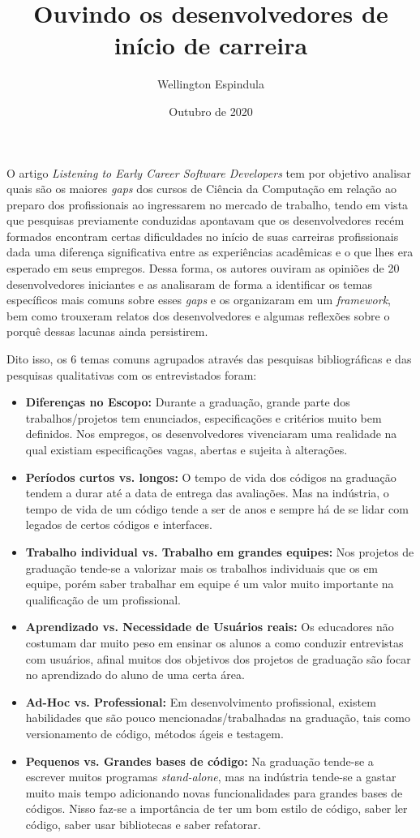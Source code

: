 \documentclass[12pt, a4paper]{article}
\title{Ouvindo os desenvolvedores de início de carreira}
\author{Wellington Espindula}
\date{Outubro de 2020}
\newcommand{\tit}[1]{\textit{#1}}
\newcommand{\tb}[1]{\textbf{#1}}
\begin{document}
    \maketitle
    O artigo \tit{Listening to Early Career Software Developers} tem por objetivo analisar quais são os maiores \tit{gaps} dos cursos de Ciência da Computação em relação ao preparo dos profissionais ao ingressarem no mercado de trabalho, tendo em vista que pesquisas previamente conduzidas apontavam que os desenvolvedores recém formados encontram certas dificuldades no início de suas carreiras profissionais dada uma diferença significativa entre as experiências acadêmicas e o que lhes era esperado em seus empregos. Dessa forma, os autores ouviram as opiniões de 20 desenvolvedores iniciantes e as analisaram de forma a identificar os temas específicos mais comuns sobre esses \tit{gaps} e os organizaram em um \tit{framework}, bem como trouxeram relatos dos desenvolvedores e algumas reflexões sobre o porquê dessas lacunas ainda persistirem.
    
    Dito isso, os 6 temas comuns agrupados através das pesquisas bibliográficas e das pesquisas qualitativas com os entrevistados foram:
    \begin{itemize}
        \item \tb{Diferenças no Escopo: } Durante a graduação, grande parte dos trabalhos/projetos tem enunciados, especificações e critérios muito bem definidos. Nos empregos, os desenvolvedores vivenciaram uma realidade na qual existiam especificações vagas, abertas e sujeita à alterações.
        \item \tb{Períodos curtos vs. longos: } O tempo de vida dos códigos na graduação tendem a durar até a data de entrega das avaliações. Mas na indústria, o tempo de vida de um código tende a ser de anos e sempre há de se lidar com legados de certos códigos e interfaces.
        \item \tb{Trabalho individual vs. Trabalho em grandes equipes: } Nos projetos de graduação tende-se a valorizar mais os trabalhos individuais que os em equipe, porém saber trabalhar em equipe é um valor muito importante na qualificação de um profissional.
        \item \tb{Aprendizado vs. Necessidade de Usuários reais: } Os educadores não costumam dar muito peso em ensinar os alunos a como conduzir entrevistas com usuários, afinal muitos dos objetivos dos projetos de graduação são focar no aprendizado do aluno de uma certa área.
        \item \tb{Ad-Hoc vs. Professional: } Em desenvolvimento profissional, existem habilidades que são pouco mencionadas/trabalhadas na graduação, tais como versionamento de código, métodos ágeis e testagem.
        \item \tb{Pequenos vs. Grandes bases de código: } Na graduação tende-se a escrever muitos programas \tit{stand-alone}, mas na indústria tende-se a gastar muito mais tempo adicionando novas funcionalidades para grandes bases de códigos. Nisso faz-se a importância de ter um bom estilo de código, saber ler código, saber usar bibliotecas e saber refatorar.
    \end{itemize}
    
\end{document}
